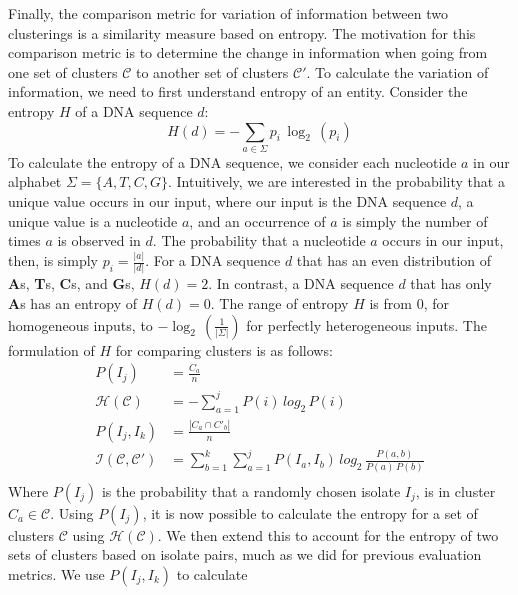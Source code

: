 \documentclass[12pt]{ucthesis}
\begin{document}
      Finally, the comparison metric for variation of information between two
      clusterings is a similarity measure based on entropy. The motivation for
      this comparison metric is to determine the change in information when
      going from one set of clusters $\mathcal{C}$ to another set of clusters
      $\mathcal{C}'$. To calculate the variation of information, we need to
      first understand entropy of an entity. Consider the entropy $H$ of a DNA
      sequence $d$:
      $$H(d) = -\sum_{a\in\Sigma}p_{i}\,\log_{2}\,(p_{i})$$
      To calculate the entropy of a DNA sequence, we consider each nucleotide
      $a$ in our alphabet $\Sigma = \{A, T, C, G\}$. Intuitively, we are
      interested in the probability that a unique value occurs in our input,
      where our input is the DNA sequence $d$, a unique value is a nucleotide
      $a$, and an occurrence of $a$ is simply the number of times $a$ is
      observed in $d$. The probability that a nucleotide $a$ occurs in our
      input, then, is simply $p_{i} = \frac{|a|}{|d|}$. For a DNA sequence $d$
      that has an even distribution of \textbf{A}s, \textbf{T}s, \textbf{C}s,
      and \textbf{G}s, $H(d) = 2$. In contrast, a DNA sequence $d$ that has
      only \textbf{A}s has an entropy of $H(d) = 0$. The range of entropy $H$
      is from $0$, for homogeneous inputs, to $-\log_{2}\,(\frac{1}{|\Sigma|})$
      for perfectly heterogeneous inputs. The formulation of $H$ for comparing
      clusters is as follows:
      \begin{align*}
         P(I_{j})       &= \frac{C_{a}}{n} \\
         \mathcal{H}(\mathcal{C})
                &= -\sum_{a=1}^{j}P(i)\,log_2\,P(i) \\
         P(I_{j},I_{k}) &= \frac{| C_{a} \cap C'_{b}|}{n} \\
         \mathcal{I}(\mathcal{C}, \mathcal{C}')
                &= \sum_{b=1}^{k}\sum_{a=1}^{j}
                   P(I_{a},I_{b})\,log_2\,\frac{P(a,b)}{P(a)\,P(b)} \\
      \end{align*}
      Where $P(I_{j})$ is the probability that a randomly chosen isolate
      $I_{j}$, is in cluster $C_{a} \in \mathcal{C}$. Using $P(I_{j})$, it is
      now possible to calculate the entropy for a set of clusters $\mathcal{C}$
      using $\mathcal{H}(\mathcal{C})$. We then extend this to account for the
      entropy of two sets of clusters based on isolate pairs, much as we did
      for previous evaluation metrics. We use $P(I_{j}, I_{k})$ to calculate
\end{document}
